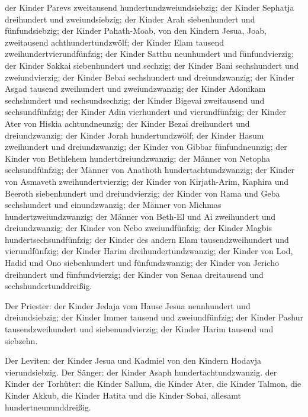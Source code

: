  der Kinder Parevs zweitausend hundertundzweiundsiebzig;
 der Kinder Sephatja dreihundert und zweiundsiebzig;
 der Kinder Arah siebenhundert und fünfundsiebzig;
 der Kinder Pahath-Moab, von den Kindern Jesua, Joab,
zweitausend achthundertundzwölf;  der Kinder Elam tausend
zweihundertvierundfünfzig;  der Kinder Satthu neunhundert
und fünfundvierzig;  der Kinder Sakkai siebenhundert und
sechzig;  der Kinder Bani sechshundert und zweiundvierzig;
 der Kinder Bebai sechshundert und dreiundzwanzig;
 der Kinder Asgad tausend zweihundert und zweiundzwanzig;
 der Kinder Adonikam sechshundert und sechsundsechzig;
 der Kinder Bigevai zweitausend und sechsundfünfzig;
 der Kinder Adin vierhundert und vierundfünfzig;
 der Kinder Ater von Hiskia achtundneunzig; 
der Kinder Bezai dreihundert und dreiundzwanzig;  der
Kinder Jorah hundertundzwölf;  der Kinder Hasum zweihundert
und dreiundzwanzig;  der Kinder von Gibbar fünfundneunzig;
 der Kinder von Bethlehem hundertdreiundzwanzig;
 der Männer von Netopha sechsundfünfzig;  der
Männer von Anathoth hundertachtundzwanzig;  der Kinder von
Asmaveth zweihundertvierzig;  der Kinder von Kirjath-Arim,
Kaphira und Beeroth siebenhundert und dreiundvierzig;  der
Kinder von Rama und Geba sechshundert und einundzwanzig; 
der Männer von Michmas hundertzweiundzwanzig;  der Männer
von Beth-El und Ai zweihundert und dreiundzwanzig;  der
Kinder von Nebo zweiundfünfzig;  der Kinder Magbis
hundertsechsundfünfzig;  der Kinder des andern Elam
tausendzweihundert und vierundfünfzig;  der Kinder Harim
dreihundertundzwanzig;  der Kinder von Lod, Hadid und Ono
siebenhundert und fünfundzwanzig;  der Kinder von Jericho
dreihundert und fünfundvierzig;  der Kinder von Senaa
dreitausend und sechshundertunddreißig.

 Der Priester: der Kinder Jedaja vom Hause Jesua
neunhundert und dreiundsiebzig;  der Kinder Immer tausend
und zweiundfünfzig;  der Kinder Pashur tausendzweihundert
und siebenundvierzig;  der Kinder Harim tausend und
siebzehn.

 Der Leviten: der Kinder Jesua und Kadmiel von den Kindern
Hodavja vierundsiebzig.  Der Sänger: der Kinder Asaph
hundertachtundzwanzig.  der Kinder der Torhüter: die Kinder
Sallum, die Kinder Ater, die Kinder Talmon, die Kinder Akkub, die Kinder
Hatita und die Kinder Sobai, allesamt hundertneununddreißig.

